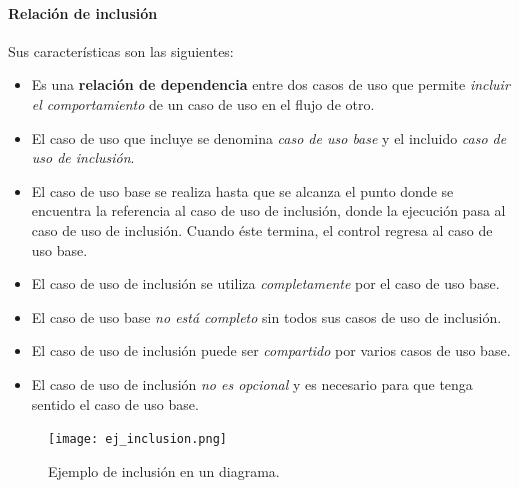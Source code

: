 \documentclass[12pt,spanish]{article}
\begin{document}
\paragraph{Relación de inclusión}

Sus características son las siguientes:
\begin{itemize}
	\item Es una \textbf{relación de dependencia} entre dos casos de uso que permite \emph{incluir el comportamiento} de un caso de uso en el flujo de otro.
	\item El caso de uso que incluye se denomina \emph{caso de uso base} y el incluido \emph{caso de uso de inclusión}.
	\item El caso de uso base se realiza hasta que se alcanza el punto donde se encuentra la referencia al caso de uso de inclusión, donde la ejecución pasa al caso de uso de inclusión. Cuando éste termina, el control regresa al caso de uso base.
	\item El caso de uso de inclusión se utiliza \emph{completamente} por el caso de uso base.
	\item El caso de uso base \emph{no está completo} sin todos sus casos de uso de inclusión.
	\item El caso de uso de inclusión puede ser \emph{compartido} por varios casos de uso base.
	\item El caso de uso de inclusión \emph{no es opcional} y es necesario para que tenga sentido el caso de uso base.
\end{itemize}

\begin{figure}[H]
\centering
\texttt{[image: ej\_inclusion.png]}
\caption{Ejemplo de inclusión en un diagrama.}
\end{figure}
\end{document}
